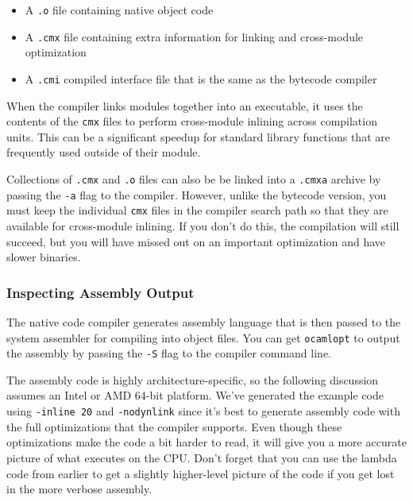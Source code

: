 \begin{itemize}
\item
  A \passthrough{\lstinline!.o!} file containing native object code
\item
  A \passthrough{\lstinline!.cmx!} file containing extra information for
  linking and cross-module optimization
\item
  A \passthrough{\lstinline!.cmi!} compiled interface file that is the
  same as the bytecode compiler
\end{itemize}

When the compiler links modules together into an executable, it uses the
contents of the \passthrough{\lstinline!cmx!} files to perform
cross-module inlining across compilation units. This can be a
significant speedup for standard library functions that are frequently
used outside of their module.

Collections of \passthrough{\lstinline!.cmx!} and
\passthrough{\lstinline!.o!} files can also be be linked into a
\passthrough{\lstinline!.cmxa!} archive by passing the
\passthrough{\lstinline!-a!} flag to the compiler. However, unlike the
bytecode version, you must keep the individual
\passthrough{\lstinline!cmx!} files in the compiler search path so that
they are available for cross-module inlining. If you don't do this, the
compilation will still succeed, but you will have missed out on an
important optimization and have slower binaries.

\hypertarget{inspecting-assembly-output}{%
\subsubsection{Inspecting Assembly
Output}\label{inspecting-assembly-output}}

The native code compiler generates assembly language that is then passed
to the system assembler for compiling into object files. You can get
\passthrough{\lstinline!ocamlopt!} to output the assembly by passing the
\passthrough{\lstinline!-S!} flag to the compiler command
line.

The assembly code is highly architecture-specific, so the following
discussion assumes an Intel or AMD 64-bit platform. We've generated the
example code using \passthrough{\lstinline!-inline 20!} and
\passthrough{\lstinline!-nodynlink!} since it's best to generate
assembly code with the full optimizations that the compiler supports.
Even though these optimizations make the code a bit harder to read, it
will give you a more accurate picture of what executes on the CPU. Don't
forget that you can use the lambda code from earlier to get a slightly
higher-level picture of the code if you get lost in the more verbose
assembly.


